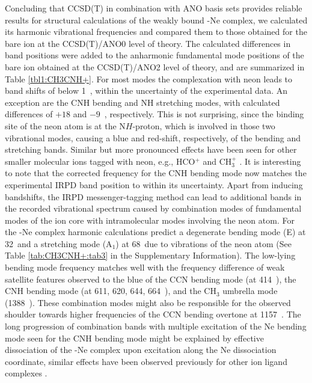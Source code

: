 Concluding that CCSD(T) in combination with ANO basis sets provides reliable results for structural calculations of the weakly bound \pan-Ne complex, we calculated its harmonic vibrational frequencies and compared them to those obtained for the bare \pa ion at the CCSD(T)/ANO0 level of theory. The calculated differences in band positions were added to the anharmonic fundamental mode positions of the bare ion obtained at the CCSD(T)/ANO2 level of theory, and are summarized in Table \ref{tbl1:CH3CNH+}. For most modes the complexation with neon leads to band shifts of below 1~\wn, within the uncertainty of the experimental data. An exception are the CNH bending and NH stretching modes, with calculated differences of $+18$ and $-9$~\wn, respectively. This is not surprising, since the binding site of the neon atom is at the N$H$-proton, which is involved in those two vibrational modes, causing a blue and red-shift, respectively, of the bending and stretching bands. Similar but more pronounced effects have been seen for other smaller molecular ions tagged with neon, e.g., HCO$^+$ \cite{NDM1996} and CH$_3^+$ \cite{DOM2000}. It is interesting to note that the corrected frequency for the CNH bending mode now matches the experimental IRPD band position to within its uncertainty. Apart from inducing bandshifts, the IRPD messenger-tagging method can lead to additional bands in the recorded vibrational spectrum caused by combination modes of fundamental modes of the ion core with intramolecular modes involving the neon atom. For the \pan-Ne complex harmonic calculations predict a degenerate bending mode (E) at 32~\wnn and a stretching mode (A$_1$) at 68~\wnn due to vibrations of the neon atom (See Table \ref{tab:CH3CNH+:tab3} in the Supplementary Information). The low-lying bending mode frequency matches well with the frequency difference of weak satellite features observed to the blue of the CCN bending mode (at 414~\wnn), the CNH bending mode (at 611, 620, 644, 664~\wnn), and the CH$_3$ umbrella mode (1388~\wnn). These combination modes might also be responsible for the observed shoulder towards higher frequencies of the CCN bending overtone at 1157~\wn. The long progression of combination bands with multiple excitation of the Ne bending mode seen for the CNH bending mode might be explained by effective dissociation of the \pan-Ne complex upon excitation along the Ne dissociation coordinate, similar effects have been observed previously for other ion ligand complexes \cite{okumura_vibrational_1985,PKB2003,jusko_felion_2019}.

